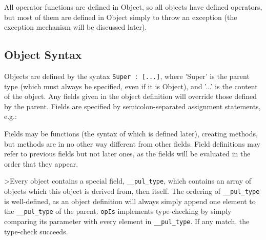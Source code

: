 All operator functions are defined in Object, so all objects have defined operators, but most of them are defined in Object simply to throw an exception (the exception mechanism will be discussed later).

\begin{comment}
<p class="P5"><span class="T10">opEqual</span> and <span class="T10">opNotEqual</span> check object identity in Object, but should be overloaded in any code with a well-defined equality operation. <span class="T10">opIs</span> implements type-checking, which will be described further in the next section.
\end{comment}



\subsection{Object Syntax}

Objects are defined by the syntax \texttt{Super : [...]}, where 'Super' is the parent type (which must always be specified, even if it is Object), and '...' is the content of the object. Any fields given in the object definition will override those defined by the parent. Fields are specified by semicolon-separated assignment statements, e.g.:

\begin{comment}
<p class="P20">var O = Object : [

<p class="P20"><span style="margin-left:;"/>x = 3;

<p class="P20"><span style="margin-left:;"/>y = 4;

<p class="P20">];
\end{comment}



Fields may be functions (the syntax of which is defined later), creating methods, but methods are in no other way different from other fields. Field definitions may refer to previous fields but not later ones, as the fields will be evaluated in the order that they appear.

>Every object contains a special field, \texttt{\_\_pul\_type}, which contains an array of objects which this object is derived from, then itself. The ordering of \texttt{\_\_pul\_type} is well-defined, as an object definition will always simply append one element to the \texttt{\_\_pul\_type} of the parent. \texttt{opIs} implements type-checking by simply comparing its parameter with every element in \texttt{\_\_pul\_type}. If any match, the type-check succeeds.



